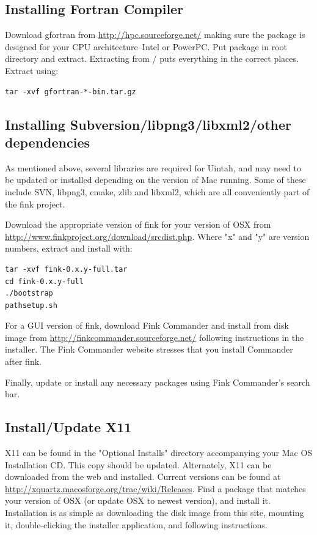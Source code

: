 \documentclass[12pt]{article}
\begin{document}
\subsection{Installing Fortran Compiler}
Download gfortran from \url{http://hpc.sourceforge.net/} making sure the package is designed for your CPU architecture--Intel or PowerPC.  Put package in root directory and extract.  Extracting from / puts everything in the correct places.  Extract using:

\begin{verbatim}
tar -xvf gfortran-*-bin.tar.gz
\end{verbatim}

\subsection{Installing Subversion/libpng3/libxml2/other dependencies}
As mentioned above, several libraries are required for Uintah, and may need to be updated or installed depending on the version of Mac running.  Some of these include SVN, libpng3, cmake, zlib and libxml2, which are all conveniently part of the fink project.

Download the appropriate version of fink for your version of OSX from \url{http://www.finkproject.org/download/srcdist.php}.  Where "x" and "y" are version numbers, extract and install with:

\begin{verbatim}
tar -xvf fink-0.x.y-full.tar 
cd fink-0.x.y-full
./bootstrap 
pathsetup.sh
\end{verbatim}

For a GUI version of fink, download Fink Commander and install from disk image from \url{http://finkcommander.sourceforge.net/} following instructions in the installer.  The Fink Commander website stresses that you install Commander after fink.

Finally, update or install any necessary packages using Fink Commander's search bar.

\subsection{Install/Update X11}
X11 can be found in the "Optional Installs" directory accompanying your Mac OS Installation CD.  This copy should be updated.  Alternately, X11 can be downloaded from the web and installed.  Current versions can be found at \url{http://xquartz.macosforge.org/trac/wiki/Releases}.  Find a package that matches your version of OSX (or update OSX to newest version), and install it.  
Installation is as simple as downloading the disk image from this site, mounting it, double-clicking the installer application, and following instructions.
\end{document}
